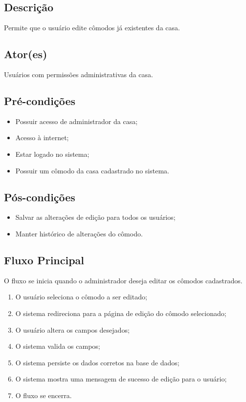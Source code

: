     \subsection{Descrição}
        Permite que o usuário edite cômodos já existentes da casa.
    \subsection{Ator(es)}
        Usuários com permissões administrativas da casa.
    \subsection{Pré-condições}
        \begin{itemize}
            \item Possuir acesso de administrador da casa;
            \item Acesso à internet;
            \item Estar logado no sistema;
            \item Possuir um cômodo da casa cadastrado no sistema.
        \end{itemize}
    \subsection{Pós-condições}
        \begin{itemize}
            \item Salvar as alterações de edição para todos os usuários;
            \item Manter histórico de alterações do cômodo.
        \end{itemize}
    \subsection{Fluxo Principal}
        O fluxo se inicia quando o administrador deseja editar os cômodos cadastrados.
        \begin{enumerate}
            \item O usuário seleciona o cômodo a ser editado;
            \item O sistema redireciona para a página de edição do cômodo selecionado;
            \item O usuário altera os campos desejados;
            \item O sistema valida os campos;
            \item O sistema persiste os dados corretos na base de dados;
            \item O sistema mostra uma mensagem de sucesso de edição para o usuário;
            \item O fluxo se encerra.
        \end{enumerate}

